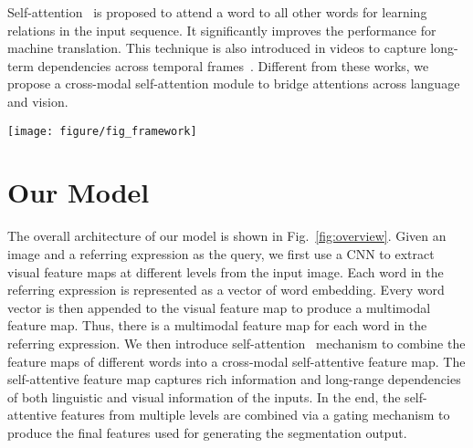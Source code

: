 \documentclass[10pt,twocolumn,letterpaper]{article}
\begin{document}
Self-attention~\cite{vaswani2017attention} is proposed to attend a word to all other words for learning relations in the input sequence. It significantly improves the performance for machine translation. This technique is also introduced in videos to capture long-term dependencies across temporal frames~\cite{wang2018non}. Different from these works, we propose a cross-modal self-attention module to bridge attentions across language and vision.
 \begin{figure*}[ht]
\begin{center}
\texttt{[image: figure/fig\_framework]}
\end{center}
   \caption{An overview of our approach. The proposed model consists of three components including multimodal features, cross-modal self-attention (CMSA) and a gated multi-level fusion. Multimodal features are constructed from the image feature, the spatial coordinate feature and the language feature for each word. Then the multimodual feature at each level is fed to a cross-modal self-attention module to build long-range dependencies across individual words and spatial regions. Finally, the gated multi-level fusion module combines the features from different levels to produce the final segmentation mask.}
\label{fig:overview}
\end{figure*}

\section{Our Model}\label{sec:approach}

The overall architecture of our model is shown in Fig.~\ref{fig:overview}. Given an image and a referring expression as the query, we first use a CNN to extract visual feature maps at different levels from the input image. Each word in the referring expression is represented as a vector of word embedding. Every word vector is then appended to the visual feature map to produce a multimodal feature map. Thus, there is a multimodal feature map for each word in the referring expression. We then introduce self-attention~\cite{vaswani2017attention} mechanism to combine the feature maps of different words into a cross-modal self-attentive feature map. The self-attentive feature map captures rich information and long-range dependencies of both linguistic and visual information of the inputs. In the end, the self-attentive features from multiple levels are combined via a gating mechanism to produce the final features used for generating the segmentation output.
\end{document}
